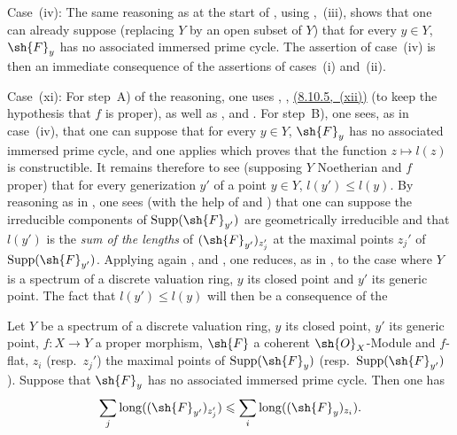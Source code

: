 \begin{env}[12.2.1.2]
\label{IV.12.2.1.2}
Case~(iv): The same reasoning as at the start of , using ,~(iii), shows that one can already suppose (replacing $Y$ by an open subset of $Y$) that for every $y\in Y$, $\sh{F}_y$ has no associated immersed prime cycle.
The assertion of case~(iv) is then an immediate consequence of the assertions of cases~(i) and~(ii).
\end{env}

\begin{env}[12.2.1.3]
\label{IV.12.2.1.3}
Case~(xi): For step~A) of the reasoning, one uses , , {\hyperlink{ega4.c04.thm.8-10-5}{(8.10.5,~(xii))}} (to keep the hypothesis that $f$ is proper), as well as ,  and .
For step~B), one sees, as in case~(iv), that one can suppose that for every $y\in Y$, $\sh{F}_y$ has no associated immersed prime cycle, and one applies  which proves that the function $z\mapsto l(z)$ is constructible.
It remains therefore to see (supposing $Y$ Noetherian and $f$ proper) that for every generization $y'$ of a point $y\in Y$, $l(y')\leqslant l(y)$.
By reasoning as in , one sees (with the help of  and ) that one can suppose the irreducible components of $\operatorname{Supp}(\sh{F}_{y'})$ are geometrically irreducible and that $l(y')$ is the \emph{sum of the lengths} of $(\sh{F}_{y'})_{z_j'}$ at the maximal points $z_j'$ of $\operatorname{Supp}(\sh{F}_{y'})$.
Applying again ,  and , one reduces, as in , to the case where $Y$ is a spectrum of a discrete valuation ring, $y$ its closed point and $y'$ its generic point.
The fact that $l(y')\leqslant l(y)$ will then be a consequence of the

\begin{lemma}[12.2.1.4]
\label{IV.12.2.1.4}
Let $Y$ be a spectrum of a discrete valuation ring, $y$ its closed point, $y'$ its generic point, $f:X\to Y$ a proper morphism, $\sh{F}$ a coherent $\sh{O}_X$-Module and $f$-flat, $z_i$ \textnormal{(}resp.\ $z_j'$\textnormal{)} the maximal points of $\operatorname{Supp}(\sh{F}_y)$ \textnormal{(}resp.\ $\operatorname{Supp}(\sh{F}_{y'})$\textnormal{)}.
Suppose that $\sh{F}_y$ has no associated immersed prime cycle.
Then one has
\[
  \sum_j \operatorname{long}((\sh{F}_{y'})_{z_j'}) \leqslant \sum_i \operatorname{long}((\sh{F}_y)_{z_i}).
\]
\end{lemma}


\end{env}
